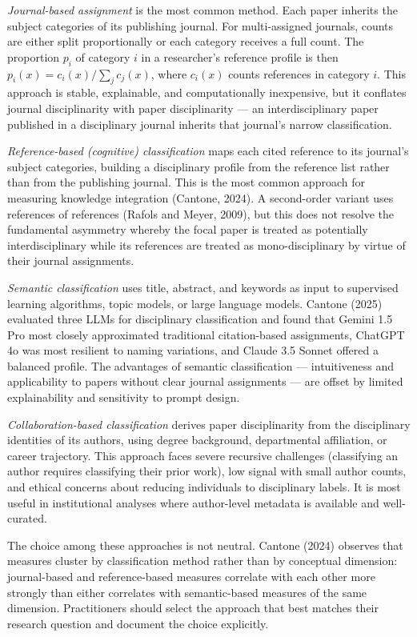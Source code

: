 \documentclass[
]{article}
\begin{document}
\emph{Journal-based assignment} is the most common method. Each paper
inherits the subject categories of its publishing journal. For
multi-assigned journals, counts are either split proportionally or each
category receives a full count. The proportion \(p_i\) of category \(i\)
in a researcher's reference profile is then
\(p_i(x) = c_i(x) / \sum_j c_j(x)\), where \(c_i(x)\) counts references
in category \(i\). This approach is stable, explainable, and
computationally inexpensive, but it conflates journal disciplinarity
with paper disciplinarity --- an interdisciplinary paper published in a
disciplinary journal inherits that journal's narrow classification.

\emph{Reference-based (cognitive) classification} maps each cited
reference to its journal's subject categories, building a disciplinary
profile from the reference list rather than from the publishing journal.
This is the most common approach for measuring knowledge integration
(Cantone, 2024). A second-order variant uses references of references
(Rafols and Meyer, 2009), but this does not resolve the fundamental
asymmetry whereby the focal paper is treated as potentially
interdisciplinary while its references are treated as mono-disciplinary
by virtue of their journal assignments.

\emph{Semantic classification} uses title, abstract, and keywords as
input to supervised learning algorithms, topic models, or large language
models. Cantone (2025) evaluated three LLMs for disciplinary
classification and found that Gemini 1.5 Pro most closely approximated
traditional citation-based assignments, ChatGPT 4o was most resilient to
naming variations, and Claude 3.5 Sonnet offered a balanced profile. The
advantages of semantic classification --- intuitiveness and
applicability to papers without clear journal assignments --- are offset
by limited explainability and sensitivity to prompt design.

\emph{Collaboration-based classification} derives paper disciplinarity
from the disciplinary identities of its authors, using degree
background, departmental affiliation, or career trajectory. This
approach faces severe recursive challenges (classifying an author
requires classifying their prior work), low signal with small author
counts, and ethical concerns about reducing individuals to disciplinary
labels. It is most useful in institutional analyses where author-level
metadata is available and well-curated.

The choice among these approaches is not neutral. Cantone (2024)
observes that measures cluster by classification method rather than by
conceptual dimension: journal-based and reference-based measures
correlate with each other more strongly than either correlates with
semantic-based measures of the same dimension. Practitioners should
select the approach that best matches their research question and
document the choice explicitly.
\end{document}
